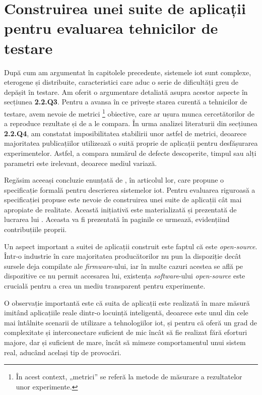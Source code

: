 \chapter{Construirea unei suite de aplicații pentru evaluarea 
tehnicilor de testare}

După cum am argumentat în capitolele precedente, sistemele \acrshort{iot} sunt complexe, eterogene și distribuite, caracteristici care aduc o serie de dificultăți greu de depășit în testare. Am oferit o argumentare detaliată asupra acestor aspecte în secțiunea \textbf{2.2.Q3}. Pentru a avansa în ce privește starea curentă a tehnicilor de testare, avem nevoie de metrici \footnote{În acest context, „metrici” se referă la metode de măsurare a rezultatelor unor experimente.} obiective, care ar ușura munca cercetătorilor de a reproduce rezultate și de a le compara. În urma analizei literaturii din secțiunea \textbf{2.2.Q4}, am constatat imposibilitatea stabilirii unor astfel de metrici, deoarece majoritatea publicațiilor utilizează o suită proprie de aplicații pentru desfășurarea experimentelor. Astfel, a compara numărul de defecte descoperite, timpul sau alți parametri este irelevant, deoarece mediul variază. 

Regăsim aceeași concluzie enunțată de \citet{Paduraru2021}, în articolul lor, care propune o specificație formală pentru descrierea sistemelor \acrshort{iot}. Pentru evaluarea riguroasă a specificației propuse este nevoie de construirea unei suite de aplicații cât mai apropiate de realitate. Această inițiativă este materializată și prezentată de lucrarea lui \citet{Cristea2022}. Aceasta va fi prezentată în paginile ce urmează, evidențiind contribuțiile proprii.

Un aspect important a suitei de aplicații construit este faptul că este \textit{open-source}. Într-o industrie în care majoritatea producătorilor nu pun la dispoziție decât sursele deja compilate ale \textit{firmware}-ului, iar în multe cazuri acestea se află pe dispozitive ce nu permit accesarea lui, existența \textit{software}-ului \textit{open-source} este crucială pentru a crea un mediu transparent pentru experimente.

O observație importantă este că suita de aplicații este realizată în mare măsură imitând aplicațiile reale dintr-o locuință inteligentă, deoarece este unul din cele mai întâlnite scenarii de utilizare a tehnologiilor \acrshort{iot}, și pentru că oferă un grad de complexitate și interconectare suficient de mic încât să fie realizat fără eforturi majore, dar și suficient de mare, încât să mimeze comportamentul unui sistem real, aducând același tip de provocări.

